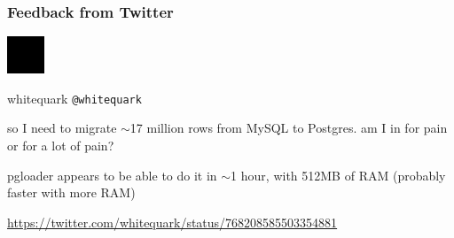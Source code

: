 \documentclass[xcolor=dvipsnames]{beamer}
\begin{document}
{

  \begin{frame}[fragile]
    \frametitle{Feedback from Twitter}

    \begin{center}
      \begin{minipage}{0,6\textwidth}
        \begin{minipage}{0,2\textwidth}
          \includegraphics[height=3em]{whitequark.png}
        \end{minipage}
        \begin{minipage}{0,8\textwidth}
          whitequark \newline
          \texttt{@whitequark}
        \end{minipage}
      \end{minipage}
      \rule[10pt]{0,6\textwidth}{1px}
      
      \begin{minipage}{0,6\textwidth}
        \begin{Large}
          so I need to migrate $\sim$17 million rows from MySQL to Postgres.
          am I in for pain or for a lot of pain?
        \end{Large}
      \end{minipage}
      \rule[10pt]{0,6\textwidth}{1px}

      \begin{minipage}{0,6\textwidth}
        \begin{Large}
          pgloader appears to be able to do it in $\sim$1 hour, with 512MB
          of RAM (probably faster with more RAM)
        \end{Large}
      \end{minipage}
      \rule{0,6\textwidth}{1px}

      \vfill
      \url{https://twitter.com/whitequark/status/768208585503354881}
    \end{center}
    
  \end{frame}
}
\end{document}
